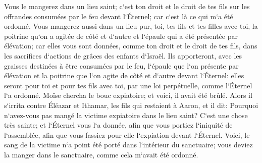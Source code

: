 \verse Vous le mangerez dans un lieu saint; c`est ton droit et le droit de tes fils sur les offrandes consumées par le feu devant l`Éternel; car c`est là ce qui m`a été ordonné. 
\verse Vous mangerez aussi dans un lieu pur, toi, tes fils et tes filles avec toi, la poitrine qu`on a agitée de côté et d`autre et l`épaule qui a été présentée par élévation; car elles vous sont données, comme ton droit et le droit de tes fils, dans les sacrifices d`actions de grâces des enfants d`Israël. 
\verse Ils apporteront, avec les graisses destinées à être consumées par le feu, l`épaule que l`on présente par élévation et la poitrine que l`on agite de côté et d`autre devant l`Éternel: elles seront pour toi et pour tes fils avec toi, par une loi perpétuelle, comme l`Éternel l`a ordonné. 
\verse Moïse chercha le bouc expiatoire; et voici, il avait été brûlé. Alors il s`irrita contre Éléazar et Ithamar, les fils qui restaient à Aaron, et il dit: 
\verse Pourquoi n`avez-vous pas mangé la victime expiatoire dans le lieu saint? C`est une chose très sainte; et l`Éternel vous l`a donnée, afin que vous portiez l`iniquité de l`assemblée, afin que vous fassiez pour elle l`expiation devant l`Éternel. 
\verse Voici, le sang de la victime n`a point été porté dans l`intérieur du sanctuaire; vous deviez la manger dans le sanctuaire, comme cela m`avait été ordonné. 

